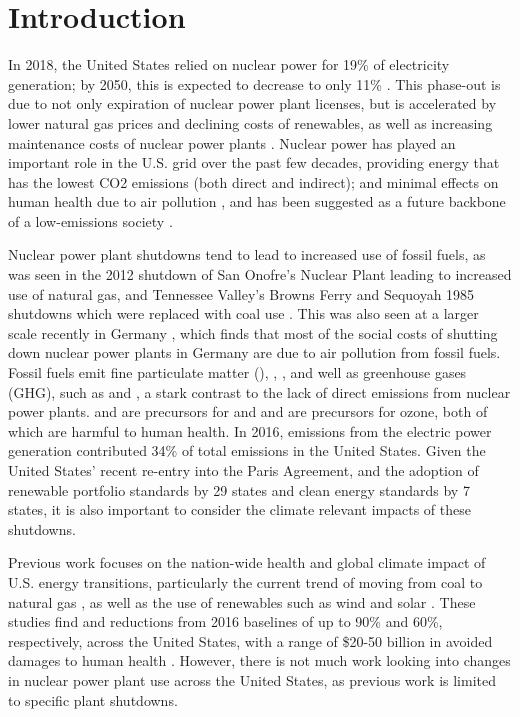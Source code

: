\documentclass[journal=jacsat,manuscript=article]{achemso}
\begin{document}
\section{Introduction}
In 2018, the United States relied on nuclear power for 19\% of electricity generation; by 2050, this is expected to decrease to only 11\% \citep{eia_annual_2021}. This phase-out is due to not only expiration of nuclear power plant licenses, but is accelerated by lower natural gas prices and declining costs of renewables, as well as increasing maintenance costs of nuclear power plants \citep{davis_market_2016}. Nuclear power has played an important role in the U.S. grid over the past few decades, providing energy that has the lowest CO2 emissions (both direct and indirect); and minimal effects on human health due to air pollution \citep{markandya_electricity_2007}, and has been suggested as a future backbone of a low-emissions society \citep{iea_nuclear_2019}. 

Nuclear power plant shutdowns tend to lead to increased use of fossil fuels, as was seen in the 2012 shutdown of San Onofre’s Nuclear Plant leading to increased use of natural gas\citep{davis_market_2016}, and Tennessee Valley’s Browns Ferry and Sequoyah 1985 shutdowns which were replaced with coal use \citep{severnini_impacts_2017}. This was also seen at a larger scale recently in Germany \citep{jarvis_private_2019}, which finds that most of the social costs of shutting down nuclear power plants in Germany are due to air pollution from fossil fuels. Fossil fuels emit fine particulate matter (), , , and well as greenhouse gases (GHG), such as  and , a stark contrast to the lack of direct emissions from nuclear power plants.  and  are precursors for  and  and  are precursors for ozone, both of which are harmful to human health\citep{vodonos_concentration-response_2018,atkinson_long-term_2016}. In 2016,  emissions from the electric power generation contributed 34\% of total  emissions in the United States. Given the United States' recent re-entry into the Paris Agreement, and the adoption of renewable portfolio standards by 29 states and clean energy standards by 7 states\citep{center_for_climate_and_energy_solutions_us_2020}, it is also important to consider the climate relevant impacts of these shutdowns.

Previous work focuses on the nation-wide health and global climate impact of U.S. energy transitions, particularly the current trend of moving from coal to natural gas \citep{lueken_climate_2016, zhang_climate_2016}, as well as the use of renewables such as wind and solar \citep{millstein_climate_2017}. These studies find  and  reductions from 2016 baselines of up to 90\% and 60\%, respectively, across the United States, with a range of \$20-50 billion in avoided damages to human health \citep{lueken_climate_2016}. However, there is not much work looking into changes in nuclear power plant use across the United States, as previous work is limited to specific plant shutdowns. 
\end{document}
